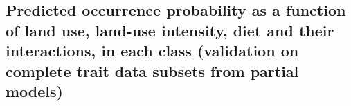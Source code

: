 \documentclass[11pt]{article}
\begin{document}

\subsection{Predicted occurrence probability as a function of land use, land-use intensity, diet and their interactions, in each class (validation on complete trait data subsets from partial models)}
\end{document}
